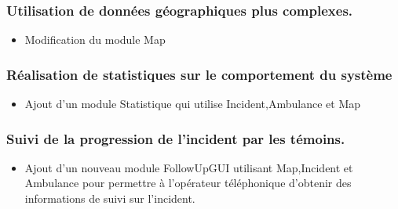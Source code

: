 	\subsubsection{Utilisation de données géographiques plus complexes.}
		\begin{itemize}
			\item Modification du module Map
		\end{itemize}
	\subsubsection{Réalisation de statistiques sur le comportement du système}
		\begin{itemize}
			\item Ajout d'un module Statistique qui utilise Incident,Ambulance et Map
		\end{itemize}
	\subsubsection{Suivi de la progression de l'incident par les témoins.}
		\begin{itemize}
			\item Ajout d'un nouveau module FollowUpGUI utilisant Map,Incident et Ambulance
				pour permettre à l'opérateur téléphonique d'obtenir des informations
				de suivi sur l'incident. 
		\end{itemize}
	
	
		
	







